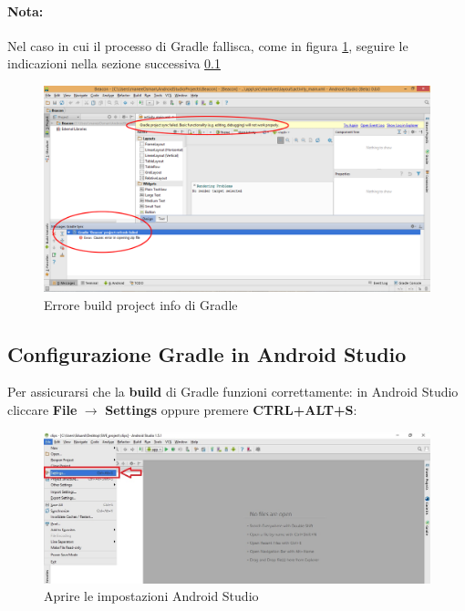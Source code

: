 \documentclass[../ManualeSviluppatore.tex]{subfiles}
\begin{document}
		\paragraph*{Nota:}
			Nel caso in cui il processo di Gradle fallisca, come in figura \ref{fig:GradleError}, seguire le indicazioni nella sezione successiva \ref{subsec:ConfigGradleAS}
			
		\begin{figure} [h]
			\centering
			\includegraphics[width=\textwidth]{img/GradleError}
			\caption{Errore build project info di Gradle}
			\label{fig:GradleError}
		\end{figure}
		
		\newpage
		\subsection{Configurazione Gradle in Android Studio}
		\label{subsec:ConfigGradleAS}
			Per assicurarsi che la \textbf{build} di Gradle funzioni correttamente: in Android Studio cliccare \textbf{File} $\rightarrow$ \textbf{Settings} oppure premere \textbf{CTRL+ALT+S}:
			
		
		\begin{figure} [h]
			\centering
			\includegraphics[width=\textwidth]{img/settings}
			\caption{Aprire le impostazioni Android Studio}
			\label{fig:Settings}
		\end{figure}
		
\end{document}
